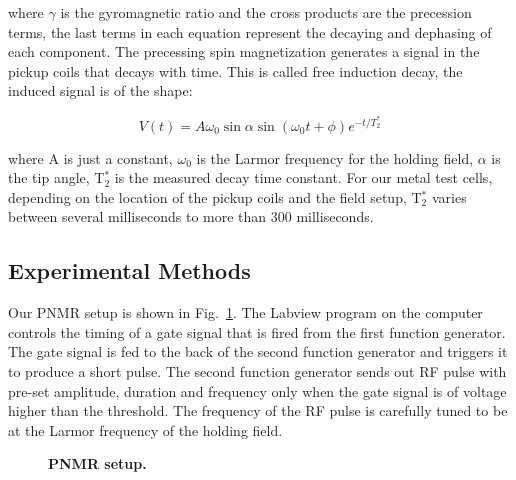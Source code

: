 where $\gamma$ is the gyromagnetic ratio and the cross products are the precession terms, the last terms in each equation represent the decaying and dephasing of each component. The precessing spin magnetization generates a signal in the pickup coils that decays with time. This is called free induction decay, the induced signal is of the shape:

\begin{equation}
V(t)=A\omega_{0}\sin{\alpha}\sin{\left(\omega_{0}t+\phi\right)}e^{-t/T_{2}^{*}}
\end{equation}

where A is just a constant, $\omega_{0}$ is the Larmor frequency for the holding field, $\alpha$ is the tip angle, T$_{2}^{*}$ is the measured decay time constant. For our metal test cells, depending on the location of the pickup coils and the field setup, T$_{2}^{*}$ varies between several milliseconds to more than 300 milliseconds.

\subsection{Experimental Methods}

Our PNMR setup is shown in Fig.~\ref{PNMR_setup}. The Labview program on the computer controls the timing of a gate signal that is fired from the first function generator. The gate signal is fed to the back of the second function generator and triggers it to produce a short pulse. The second function generator sends out RF pulse with pre-set amplitude, duration and frequency only when the gate signal is of voltage higher than the threshold. The frequency of the RF pulse is carefully tuned to be at the Larmor frequency of the holding field. 

\begin{figure}[t!]
	\centering
	\caption{{\bf PNMR setup.}}
	\label{PNMR_setup}
\end{figure}

